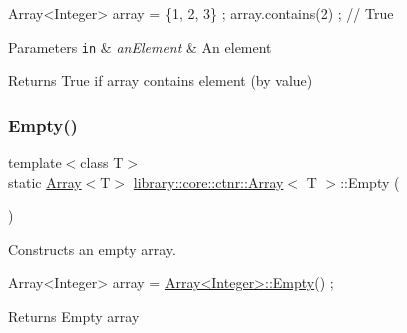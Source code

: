 \begin{DoxyCode}
Array<Integer> array = \{1, 2, 3\} ;
array.contains(2) ; \textcolor{comment}{// True}
\end{DoxyCode}



\begin{DoxyParams}[1]{Parameters}
\mbox{\tt in}  & {\em an\+Element} & An element \\
\hline
\end{DoxyParams}
\begin{DoxyReturn}{Returns}
True if array contains element (by value) 
\end{DoxyReturn}
\mbox{\label{classlibrary_1_1core_1_1ctnr_1_1_array_a7795ee997ae6008cd0bc8db607315524}} 
\subsubsection{\texorpdfstring{Empty()}{Empty()}}
{\footnotesize\ttfamily template$<$class T$>$ \\
static \hyperlink{classlibrary_1_1core_1_1ctnr_1_1_array}{Array}$<$T$>$ \hyperlink{classlibrary_1_1core_1_1ctnr_1_1_array}{library\+::core\+::ctnr\+::\+Array}$<$ T $>$\+::Empty (\begin{DoxyParamCaption}{ }\end{DoxyParamCaption})\hspace{0.3cm}{\ttfamily [static]}}



Constructs an empty array. 


\begin{DoxyCode}
Array<Integer> array = \hyperlink{classlibrary_1_1core_1_1ctnr_1_1_array_a7795ee997ae6008cd0bc8db607315524}{Array<Integer>::Empty}() ;
\end{DoxyCode}


\begin{DoxyReturn}{Returns}
Empty array 
\end{DoxyReturn}
\mbox{\label{classlibrary_1_1core_1_1ctnr_1_1_array_aeb8ed38b67b6031e27c188d89bd5cbbf}} 
